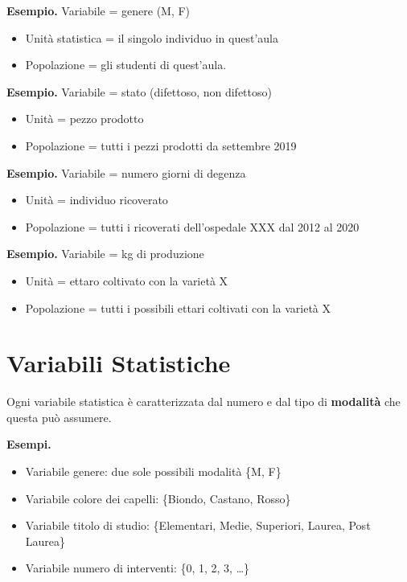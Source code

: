 \documentclass[
  11pt,
]{book}
\providecommand{\tightlist}{%
  \setlength{\itemsep}{0pt}\setlength{\parskip}{0pt}}
\theoremstyle{mytheoremstyle}
\theoremstyle{mydefstyle}
\begin{document}
\textbf{Esempio.} Variabile = genere (M, F)

\begin{itemize}
\tightlist
\item
  Unità statistica = il singolo individuo in quest'aula
\item
  Popolazione = gli studenti di quest'aula.
\end{itemize}

\textbf{Esempio.} Variabile = stato (difettoso, non difettoso)

\begin{itemize}
\tightlist
\item
  Unità = pezzo prodotto
\item
  Popolazione = tutti i pezzi prodotti da settembre 2019
\end{itemize}

\textbf{Esempio.} Variabile = numero giorni di degenza

\begin{itemize}
\tightlist
\item
  Unità = individuo ricoverato
\item
  Popolazione = tutti i ricoverati dell'ospedale XXX dal 2012 al 2020
\end{itemize}

\textbf{Esempio.} Variabile = kg di produzione

\begin{itemize}
\tightlist
\item
  Unità = ettaro coltivato con la varietà X
\item
  Popolazione = tutti i possibili ettari coltivati con la varietà X
\end{itemize}

\section{Variabili Statistiche}\label{var-stat}

Ogni variabile statistica è caratterizzata dal numero e dal tipo di \textbf{modalità} che questa può assumere.

\textbf{Esempi.}

\begin{itemize}
\tightlist
\item
  Variabile genere: due sole possibili modalità \{M, F\}
\item
  Variabile colore dei capelli: \{Biondo, Castano, Rosso\}
\item
  Variabile titolo di studio: \{Elementari, Medie, Superiori, Laurea, Post Laurea\}
\item
  Variabile numero di interventi: \{0, 1, 2, 3, \ldots\}
\end{itemize}
\end{document}
